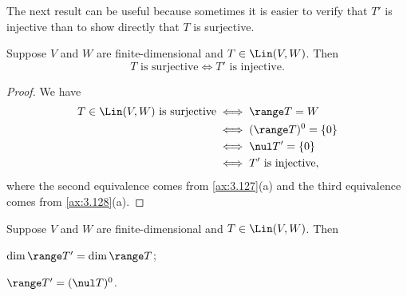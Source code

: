 The next result can be useful because sometimes it is easier to verify that $T'$
is injective than to show directly that $T$ is surjective.

\begin{result}\label{ax:3.129}
Suppose $V$ and $W$ are finite-dimensional and $T\in\Lin(V,W)$. Then
\[ T \text{ is surjective} \iff T' \text{ is injective}. \]
\end{result}

\begin{proof}
We have
\begin{align*}
T\in\Lin(V,W)\text{ is surjective} &\iff \range T=W\\
  &\iff (\range T)^0=\{0\}\\
  &\iff \nul T'=\{0\}\\
  &\iff T'\text{ is injective},
\end{align*}
where the second equivalence comes from \ref{ax:3.127}(a) and the third
equivalence comes from \ref{ax:3.128}(a).
\end{proof}

\begin{result}\label{ax:3.130}
Suppose $V$ and $W$ are finite-dimensional and $T\in\Lin(V,W)$. Then
\begin{parts}
\item $\dim\range T'=\dim\range T$;
\item $\range T'=(\nul T)^0$.
\end{parts}
\end{result}

